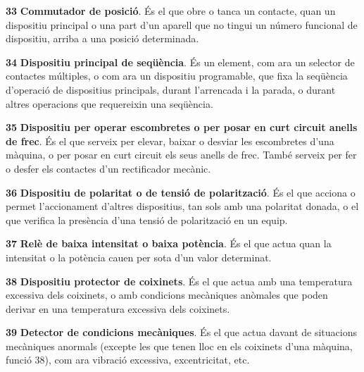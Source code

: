 \begin{multicols}{2}
\begin{list}{}
\item[\textbf{33}]  \textbf{Commutador de posici\'{o}}. \'{E}s el que
obre o tanca un contacte, quan un dispositiu principal o una part d'un aparell que no tingui un n\'{u}mero funcional de dispositiu, arriba a una posici\'{o} determinada.

\item[\textbf{34}]  \textbf{Dispositiu principal de
 seq\"{u}\`{e}ncia}. \'{E}s un element, com ara un selector de contactes m\'{u}ltiples, o com ara un
 dispositiu programable,
 que fixa la seq\"{u}\`{e}ncia d'operaci\'{o}
de dispositius principals, durant l'arrencada i la parada, o durant altres operacions
que requereixin una seq\"{u}\`{e}ncia.

\item[\textbf{35}]   \textbf{Dispositiu per operar escombretes o per posar en curt
circuit anells de frec}. \'{E}s el que serveix per elevar, baixar o
desviar les escombretes d'una m\`{a}quina, o per posar en curt circuit
els seus anells de frec. Tamb\'{e} serveix per fer o desfer els
contactes d'un rectificador mec\`{a}nic.

\item[\textbf{36}] 
 \textbf{Dispositiu de
polaritat o de tensi\'{o} de polaritzaci\'{o}}. \'{E}s el que acciona o permet
l'accionament d'altres dispositius, tan sols amb una polaritat
donada, o el que verifica la pres\`{e}ncia d'una tensi\'{o} de polaritzaci\'{o}
en un equip.

\item[\textbf{37}]  \textbf{Rel\`{e} de baixa
intensitat o baixa pot\`{e}ncia}. \'{E}s el que actua quan la intensitat o la pot\`{e}ncia cauen per
sota d'un valor determinat.

\item[\textbf{38}] 
\textbf{Dispositiu protector de coixinets}. \'{E}s el que actua amb una
temperatura excessiva dels coixinets, o amb condicions mec\`{a}niques
an\`{o}males que poden derivar en una temperatura excessiva dels
coixinets.

\item[\textbf{39}] 
\textbf{Detector de condicions mec\`{a}niques}. \'{E}s el que actua davant
de situacions mec\`{a}niques anormals (excepte les que tenen lloc en els
coixinets d'una m\`{a}quina, funci\'{o} 38), com ara vibraci\'{o} excessiva,
excentricitat, etc.


\end{list}
\end{multicols}
